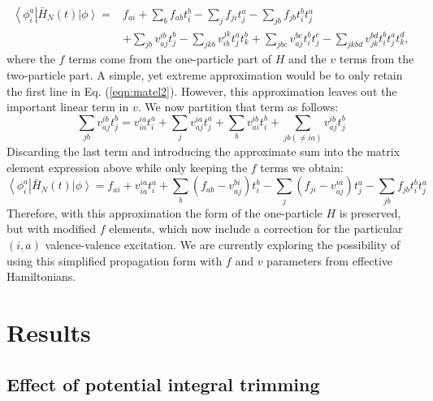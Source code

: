 \documentclass[aps,prb,preprint,groupaddress,floatfix]{revtex4}
\begin{document}
\begin{equation}
\label{eqn:matel2}
\begin{split}
\left< \phi_{i}^{a} \right| \bar{H}_N(t) \left| \phi \right> =&
f_{ai} + \sum_b f_{ab} t_i^b - \sum_j f_{ji} t_j^a - \sum_{jb} f_{jb} t_i^b t_j^a\\
& + \sum_{jb} v_{aj}^{ib} t_j^b
- \sum_{jkb} v_{ib}^{jk} t_j^a t_k^b + \sum_{jbc} v_{aj}^{bc} t_i^b t_j^c
- \sum_{jkbd} v_{jk}^{bd} t_i^b t_j^a t_k^d,
\end{split}
\end{equation}
where the $f$ terms come from the one-particle part of $H$ and the $v$ terms from the two-particle part. A simple, yet extreme approximation would be to only retain the first line in Eq. (\ref{eqn:matel2}). However, this approximation leaves out the important linear term in $v$. We now partition that term as follows:
\begin{equation}
\sum_{jb} v_{aj}^{ib} t_j^b = v_{ia}^{ia} t_i^a +
\sum_{j} v_{aj}^{ia} t_j^a + \sum_{b} v_{ai}^{ib} t_i^b +
\sum_{jb(\neq ia)} v_{aj}^{ib} t_j^b
\end{equation}
Discarding the last term and introducing the approximate sum into the matrix element expression above while only keeping the $f$ terms we obtain:
\begin{equation}
\label{eqn:matel3}
\left< \phi_{i}^{a} \right| \bar{H}_N(t) \left| \phi \right> =
f_{ai} + v_{ia}^{ia} t_i^a + \sum_b (f_{ab}-v_{aj}^{bi}) t_i^b
- \sum_j (f_{ji}-v_{aj}^{ia}) t_j^a
- \sum_{jb} f_{jb} t_i^b t_j^a
\end{equation}
Therefore, with this approximation the form of the one-particle $H$ is preserved, but with modified $f$ elements, which now include a correction for the particular $(i,a)$ valence-valence excitation. We are currently exploring the possibility of using this simplified propagation form with $f$ and $v$ parameters from effective Hamiltonians.

\section{Results}

\subsection{Effect of potential integral trimming}
\end{document}
